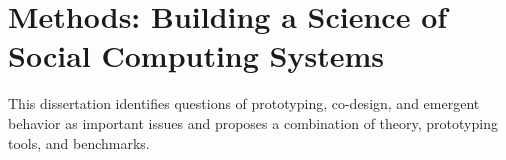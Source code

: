 


%
%
%
%
%
%


\section{Methods: Building a Science of Social Computing Systems}

This dissertation identifies questions of prototyping, co-design, and emergent behavior as important issues and proposes a combination of theory, prototyping tools, and benchmarks. 

